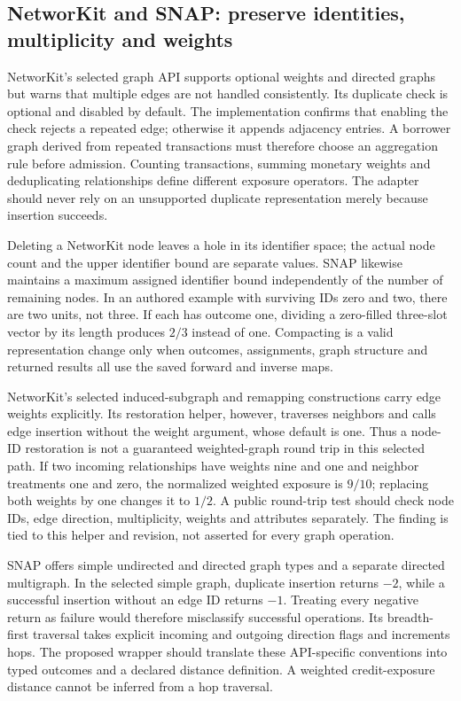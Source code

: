\subsection{NetworKit and SNAP: preserve identities, multiplicity and weights}

NetworKit's selected graph API supports optional weights and directed graphs but warns that multiple edges are not handled consistently. Its duplicate check is optional and disabled by default. The implementation confirms that enabling the check rejects a repeated edge; otherwise it appends adjacency entries. A borrower graph derived from repeated transactions must therefore choose an aggregation rule before admission. Counting transactions, summing monetary weights and deduplicating relationships define different exposure operators. The adapter should never rely on an unsupported duplicate representation merely because insertion succeeds.\citep{exec25_cnet_networkit}

Deleting a NetworKit node leaves a hole in its identifier space; the actual node count and the upper identifier bound are separate values. SNAP likewise maintains a maximum assigned identifier bound independently of the number of remaining nodes. In an authored example with surviving IDs zero and two, there are two units, not three. If each has outcome one, dividing a zero-filled three-slot vector by its length produces $2/3$ instead of one. Compacting is a valid representation change only when outcomes, assignments, graph structure and returned results all use the saved forward and inverse maps.\citep{exec25_cnet_networkit,exec25_cnet_snap,exec25_cnet_choice}

NetworKit's selected induced-subgraph and remapping constructions carry edge weights explicitly. Its restoration helper, however, traverses neighbors and calls edge insertion without the weight argument, whose default is one. Thus a node-ID restoration is not a guaranteed weighted-graph round trip in this selected path. If two incoming relationships have weights nine and one and neighbor treatments one and zero, the normalized weighted exposure is $9/10$; replacing both weights by one changes it to $1/2$. A public round-trip test should check node IDs, edge direction, multiplicity, weights and attributes separately. The finding is tied to this helper and revision, not asserted for every graph operation.\citep{exec25_cnet_networkit,exec25_cnet_choice}

SNAP offers simple undirected and directed graph types and a separate directed multigraph. In the selected simple graph, duplicate insertion returns $-2$, while a successful insertion without an edge ID returns $-1$. Treating every negative return as failure would therefore misclassify successful operations. Its breadth-first traversal takes explicit incoming and outgoing direction flags and increments hops. The proposed wrapper should translate these API-specific conventions into typed outcomes and a declared distance definition. A weighted credit-exposure distance cannot be inferred from a hop traversal.\citep{exec25_cnet_snap}

